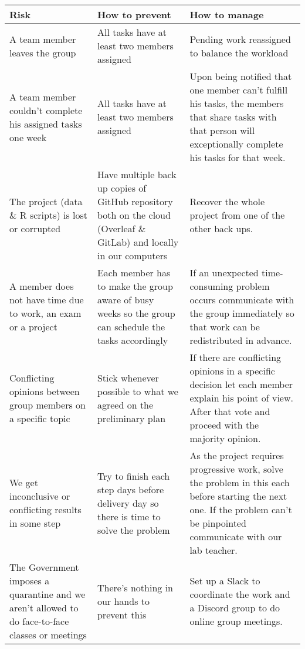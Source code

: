 \begin{table}[H]
\centering
\begin{tabular}{@{}p{5cm}p{5cm}p{5cm}@{}}
\toprule
Risk & How to prevent & How to manage \\ \midrule
A team member leaves the group & All tasks have at least two members assigned & Pending work reassigned to balance the workload\\
\addlinespace[0.5em]
A team member couldn't complete his assigned tasks one week & All tasks have at least two members assigned & Upon being notified that one member can't fulfill his tasks, the members that share tasks with that person will exceptionally complete his tasks for that week.\\
\addlinespace[0.5em]
The project (data \& R scripts) is lost or corrupted & Have multiple back up copies of GitHub repository both on the cloud (Overleaf \& GitLab) and locally in our computers & Recover the whole project from one of the other back ups.\\
\addlinespace[0.5em]
A member does not have time due to work, an exam or a project & Each member has to make the group aware of busy weeks so the group can schedule the tasks accordingly & If an unexpected time-consuming problem occurs communicate with the group immediately so that work can be redistributed in advance.\\
\addlinespace[0.5em]
Conflicting opinions between group members on a specific topic & Stick whenever possible to what we agreed on the preliminary plan & If there are conflicting opinions in a specific decision let each member explain his point of view. After that vote and proceed with the majority opinion.\\
\addlinespace[0.5em]
We get inconclusive or conflicting results in some step & Try to finish each step days before delivery day so there is time to solve the problem & As the project requires progressive work, solve the problem in this each before starting the next one. If the problem can't be pinpointed communicate with our lab teacher.  
\\
\addlinespace[0.5em]
The Government imposes a quarantine and we aren't allowed to do face-to-face classes or meetings & There's nothing in our hands to prevent this & Set up a Slack to coordinate the work and a Discord group to do online group meetings.\\

\bottomrule
\end{tabular}
\end{table}


